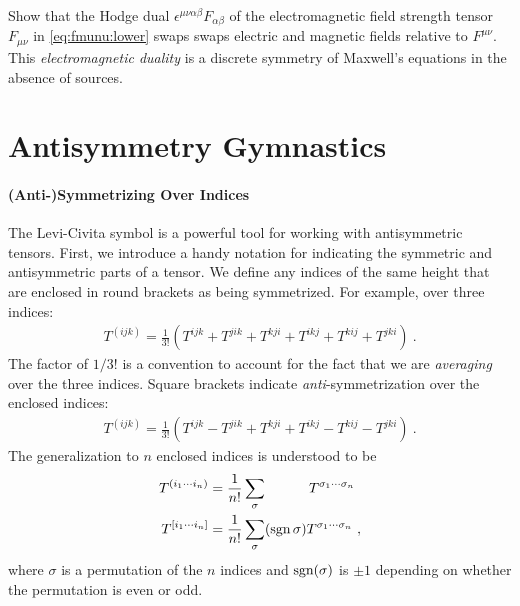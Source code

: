 \begin{exercise}
Show that the Hodge dual $\epsilon^{\mu\nu\alpha\beta}F_{\alpha\beta}$ of the electromagnetic field strength tensor $F_{\mu\nu}$ in \eqref{eq:fmunu:lower} swaps swaps electric and magnetic fields relative to $F^{\mu\nu}$. This  \emph{electromagnetic duality} is a discrete symmetry of Maxwell's equations in the absence of sources. 
\end{exercise}

\section{Antisymmetry Gymnastics}
\label{sec:antisymmetric:dynamics}

\paragraph{(Anti-)Symmetrizing Over Indices}
The Levi-Civita symbol is a powerful tool for working with antisymmetric tensors. First, we introduce a handy notation for indicating the symmetric and antisymmetric parts of a tensor. We define any indices of the same height that are enclosed in round brackets as being symmetrized. For example, over three indices: 
\begin{align}
    T^{(ijk)} = \frac{1}{3!}\left(T^{ijk} + T^{jik} + T^{kji}
                      + T^{ikj} + T^{kij} + T^{jki}\right) \ .
\end{align}
The factor of $1/3!$ is a convention to account for the fact that we are \emph{averaging} over the three indices. Square brackets indicate \emph{anti}-symmetrization over the enclosed indices:
\begin{align}
    T^{(ijk)} = \frac{1}{3!}\left(T^{ijk} - T^{jik} + T^{kji}
                      + T^{ikj} - T^{kij} - T^{jki}\right) \ .
\end{align}
The generalization to $n$ enclosed indices is understood to be
\begin{align}
    T^{(i_1\cdots i_n)} &= 
    \frac{1}{n!}\sum_{\sigma} \phantom{(\sgn{\sigma})} T^{\sigma_1\cdots\sigma_n}
    \\
    T^{[i_1\cdots i_n]} &= 
    \frac{1}{n!}\sum_{\sigma} (\sgn{\sigma}) T^{\sigma_1\cdots\sigma_n} \ ,
\end{align}
where $\sigma$ is a permutation of the $n$ indices and $\operatorname{\textnormal{sgn}}(\sigma)$ is $\pm 1$ depending on whether the permutation is even or odd. 

